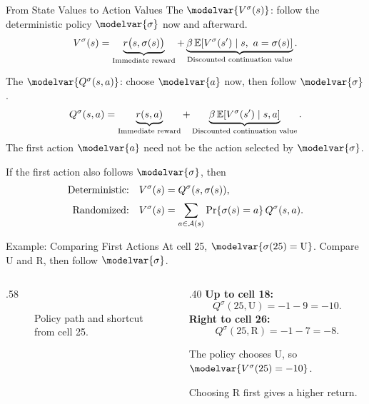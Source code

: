 \begin{frame}{From State Values to Action Values}
\small
\setlength{\abovedisplayskip}{3pt}
\setlength{\belowdisplayskip}{3pt}
The  \(\modelvar{V^\sigma(s)}\): follow the deterministic policy \(\modelvar{\sigma}\) now and afterward.
\[
V^\sigma(s)=
\underbrace{r\bigl(s,\sigma(s)\bigr)}_{\text{Immediate reward}}
+\underbrace{\beta\,\E\!\left[V^\sigma(s')\mid s,\ a=\sigma(s)\right]}_{\text{Discounted continuation value}}.
\]
\par\smallskip
The  \(\modelvar{Q^\sigma(s,a)}\): choose \(\modelvar{a}\) now, then follow \(\modelvar{\sigma}\).
\[
Q^\sigma(s,a)=
\underbrace{r(s,a)}_{\text{Immediate reward}}
+\underbrace{\beta\,\mathbb E\!\left[V^\sigma(s')\mid s,a\right]}_{\text{Discounted continuation value}}.
\]
The first action \(\modelvar{a}\) need not be the action selected by \(\modelvar{\sigma}\).
\par\smallskip
If the first action also follows \(\modelvar{\sigma}\), then
\begin{align*}
\text{Deterministic:}\quad V^\sigma(s)&=Q^\sigma(s,\sigma(s)),\\[2pt]
\text{Randomized:}\quad V^\sigma(s)&=\sum_{a\in\mathcal A(s)}\Pr\{\sigma(s)=a\}\,Q^\sigma(s,a).
\end{align*}
\end{frame}

\begin{frame}{Example: Comparing First Actions}
\small
At cell 25, \(\modelvar{\sigma(25)=\mathrm U}\). Compare U and R, then follow \(\modelvar{\sigma}\).
\begin{columns}[c]
\begin{column}{.58\textwidth}
\begin{figure}\centering
{}\MazeLegend
\caption{Policy path and shortcut from cell 25.}
\end{figure}
\end{column}
\begin{column}{.40\textwidth}
\textcolor{CourseVariableColor}{\textbf{Up to cell 18:}}
\[Q^\sigma(25,\mathrm U)=-1-9=-10.\]
\textcolor{SessionRed}{\textbf{Right to cell 26:}}
\[Q^\sigma(25,\mathrm R)=-1-7=-8.\]
\par\medskip
The policy chooses U, so \(\modelvar{V^\sigma(25)=-10}\).
\par\smallskip
Choosing R first gives a higher return.
\end{column}\end{columns}
\end{frame}

